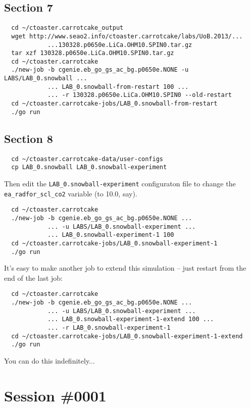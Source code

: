 \documentclass[a4paper,10pt,article]{memoir}
\begin{document}
\subsection*{Section 7}

\begin{verbatim}
  cd ~/ctoaster.carrotcake_output
  wget http://www.seao2.info/ctoaster.carrotcake/labs/UoB.2013/...
            ...130328.p0650e.LiCa.OHM10.SPIN0.tar.gz
  tar xzf 130328.p0650e.LiCa.OHM10.SPIN0.tar.gz
  cd ~/ctoaster.carrotcake
  ./new-job -b cgenie.eb_go_gs_ac_bg.p0650e.NONE -u LABS/LAB_0.snowball ...
            ... LAB_0.snowball-from-restart 100 ...
            ... -r 130328.p0650e.LiCa.OHM10.SPIN0 --old-restart
  cd ~/ctoaster.carrotcake-jobs/LAB_0.snowball-from-restart
  ./go run
\end{verbatim}

\subsection*{Section 8}

\begin{verbatim}
  cd ~/ctoaster.carrotcake-data/user-configs
  cp LAB_0.snowball LAB_0.snowball-experiment
\end{verbatim}

Then edit the \texttt{LAB\_0.snowball-experiment} configuraton file to
change the \texttt{ea\_radfor\_scl\_co2} variable (to 10.0, say).

\begin{verbatim}
  cd ~/ctoaster.carrotcake
  ./new-job -b cgenie.eb_go_gs_ac_bg.p0650e.NONE ...
            ... -u LABS/LAB_0.snowball-experiment ...
            ... LAB_0.snowball-experiment-1 100
  cd ~/ctoaster.carrotcake-jobs/LAB_0.snowball-experiment-1
  ./go run
\end{verbatim}

It's easy to make another job to extend this simulation -- just
restart from the end of the last job:
\begin{verbatim}
  cd ~/ctoaster.carrotcake
  ./new-job -b cgenie.eb_go_gs_ac_bg.p0650e.NONE ...
            ... -u LABS/LAB_0.snowball-experiment ...
            ... LAB_0.snowball-experiment-1-extend 100 ...
            ... -r LAB_0.snowball-experiment-1
  cd ~/ctoaster.carrotcake-jobs/LAB_0.snowball-experiment-1-extend
  ./go run
\end{verbatim}
You can do this indefinitely...

\section{Session \#0001}
\end{document}
